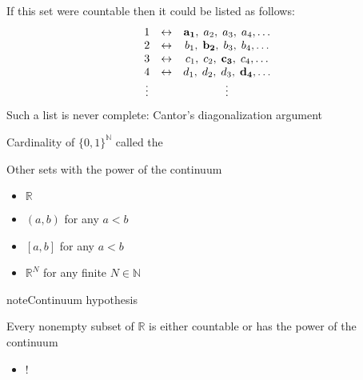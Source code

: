\documentclass[letterpaper,10pt,english]{jupyterBook}
\begin{document}
\sphinxAtStartPar
{} If this set were countable then it could be listed as follows:
\begin{equation*}
\begin{split}
\begin{matrix}
1      & \leftrightarrow & {\bf a_1}, \; a_2, \; a_3, \; a_4, \ldots \\
2      & \leftrightarrow & b_1, \;{\bf b_2}, \; b_3, \; b_4, \ldots \\
3      & \leftrightarrow & c_1, \; c_2, \;{\bf c_3}, \; c_4, \ldots \\
4      & \leftrightarrow & d_1, \; d_2, \; d_3, \;{\bf d_4}, \ldots \\
\vdots &                 & \vdots
\end{matrix}
\end{split}
\end{equation*}
\sphinxAtStartPar
Such a list is never complete: Cantor’s diagonalization argument

\sphinxAtStartPar
Cardinality of  \(\{0,1\}^{\mathbb{N}}\) called the 

\sphinxAtStartPar
Other sets with the power of the continuum
\begin{itemize}
\item {} 
\sphinxAtStartPar
\(\mathbb{R}\)

\item {} 
\sphinxAtStartPar
\((a, b)\) for any \(a < b\)

\item {} 
\sphinxAtStartPar
\([a, b]\) for any \(a < b\)

\item {} 
\sphinxAtStartPar
\(\mathbb{R}^N\) for any finite \(N \in \mathbb{N}\)

\end{itemize}

\begin{sphinxadmonition}{note}{Continuum hypothesis}

\sphinxAtStartPar
Every nonempty subset of \(\mathbb{R}\) is either
countable or has the power of the continuum
\end{sphinxadmonition}
\begin{itemize}
\item {} 
\sphinxAtStartPar
{}!

\end{itemize}
\end{document}
